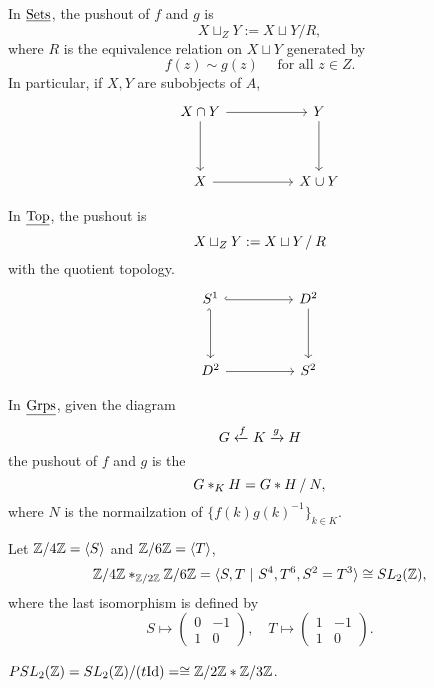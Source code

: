 \begin{examples*}
	\item In \( \underline{\mathrm{Sets}} \), the pushout of \( f \) and \( g \) is
		\[
			X \sqcup_Z Y := X \sqcup Y / R,
		\]
		where \( R \) is the equivalence relation on \( X \sqcup Y \) generated by
		\[
			f(z) \sim g(z) \quad \text{ for all } z \in Z.
		\]
		In particular, if \( X, Y \) are subobjects of \( A \),
		\[
			\begin{tikzcd}{X \cap Y} && Y \\
				\\
				X && {X \cup Y}
				\arrow[from=1-1, to=1-3]
				\arrow[from=1-1, to=3-1]
				\arrow[from=1-3, to=3-3]
				\arrow[from=3-1, to=3-3]
			\end{tikzcd}
		\]
	\item In \( \underline{\mathrm{Top}} \), the pushout is
		\[
			X \sqcup_Z Y := X \sqcup Y \mathbin{/} R
		\]
		with the quotient topology.
		\[
			\begin{tikzcd}{S^1} && {D^2} \\
				\\
				{D^2} && {S^2}
				\arrow[hook, from=1-1, to=1-3]
				\arrow[hook', from=1-1, to=3-1]
				\arrow[from=1-3, to=3-3]
				\arrow[from=3-1, to=3-3]
			\end{tikzcd}
		\]
	\item In \( \underline{\mathrm{Grps}} \), given the diagram
		\[
			G \xleftarrow{f} K \xrightarrow{g} H
		\]
		the pushout of \( f \) and \( g \) is the 
		\[
			G \ast_K H = G \ast H \mathbin{/} N,
		\]
		where \( N \) is the normailzation of \( \{f(k) g(k)^{-1}\}_{k \in K} \).

		\vspace*{3mm}

		Let \( \mathbb{Z}/4\mathbb{Z} = \langle S \rangle \) and \( \mathbb{Z}/6\mathbb{Z} = \langle T \rangle \),
		\[
			\mathbb{Z}/4\mathbb{Z} \ast_{\mathbb{Z}/2\mathbb{Z}} \mathbb{Z}/6\mathbb{Z} = \langle S, T ~|~ S^4, T^6, S^2 = T^3 \rangle \cong SL_2(\mathbb{Z}),
		\]
		where the last isomorphism is defined by
		\[
			S \mapsto
			\begin{pmatrix}
				0 & -1 \\
				1 & 0
			\end{pmatrix}
			, \quad T \mapsto
			\begin{pmatrix}
				1 & -1 \\
				1 & 0
			\end{pmatrix}
			.
		\]
		\begin{remark*}
			\( PSL_2(\mathbb{Z}) = SL_2(\mathbb{Z}) / (t \mathrm{Id}) = \cong \mathbb{Z}/2\mathbb{Z} \ast \mathbb{Z}/3\mathbb{Z} \).
		\end{remark*}


\end{examples*}
